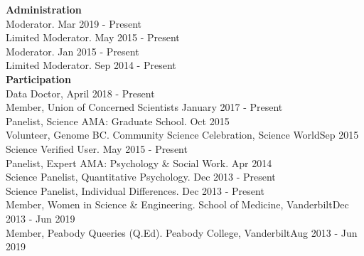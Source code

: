 {\large \textbf{Administration}}\\
Moderator. \hfill{Mar 2019 - Present}\smallskip\\
Limited Moderator. \hfill{May 2015 - Present}\smallskip\\
Moderator. \hfill{Jan 2015 - Present}\smallskip\\
Limited Moderator. \hfill{Sep 2014 - Present}\medskip\\
%
%
{\large \textbf{Participation}}\\
Data Doctor,  \hfill{April 2018 - Present}\smallskip\\
Member, Union of Concerned Scientists \hfill{January 2017 - Present}\smallskip\\
Panelist, Science AMA: Graduate School. \hfill{Oct 2015}\smallskip\\
Volunteer, Genome BC. Community Science Celebration, Science World\hfill{Sep 2015}\smallskip\\
Science Verified User. \hfill{May 2015 - Present}\smallskip\\
Panelist, Expert AMA: Psychology \& Social Work. \hfill{Apr 2014}\smallskip\\
Science Panelist, Quantitative Psychology. \hfill{Dec 2013 - Present}\smallskip\\%
Science Panelist, Individual Differences. \hfill{Dec 2013 - Present}\smallskip\\
Member, Women in Science \& Engineering. School of Medicine, Vanderbilt\hfill{Dec 2013 - Jun 2019}\smallskip\\
Member, Peabody Queeries (Q.Ed). Peabody College, Vanderbilt\hfill{Aug 2013 - Jun 2019}%
%
%
